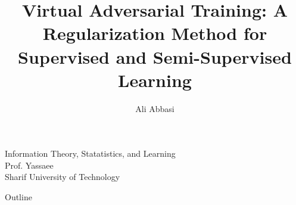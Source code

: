 \documentclass{beamer}
\title[Virtual Adversarial Training]{Virtual Adversarial Training: A Regularization Method for Supervised and Semi-Supervised Learning}
\author{Ali Abbasi}
\date{}
\begin{document}
\begin{frame}
\titlepage
\vspace{-0.8 in}
\begin{center}
Information Theory, Statatistics, and Learning\\
Prof. Yassaee\\
{\small Sharif University of Technology}
\end{center}
\end{frame}

\begin{frame}{Outline}
\tableofcontents
\end{frame}






\end{document}
